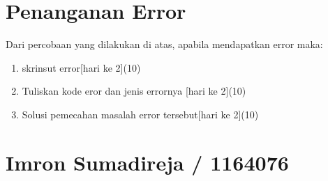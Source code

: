 \section{Penanganan Error}
Dari percobaan yang dilakukan di atas, apabila mendapatkan error maka:

\begin{enumerate}
	\item
	skrinsut error[hari ke 2](10)
	\item
Tuliskan kode eror dan jenis errornya [hari ke 2](10)
	\item
Solusi pemecahan masalah error tersebut[hari ke 2](10)

\end{enumerate}

\section{Imron Sumadireja / 1164076}
